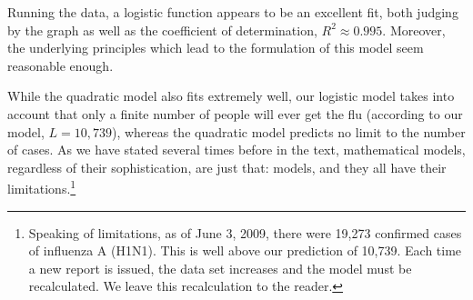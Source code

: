 \documentclass{ximera}
\begin{document}
Running the data, a logistic function appears to be an excellent fit, both judging by the graph as well as the coefficient of determination, $R^2 \approx 0.995$.  Moreover, the underlying principles which lead to the formulation of this model seem reasonable enough.

 
 \begin{center}
 \end{center}

  While the quadratic model also fits extremely well, our logistic model takes into account that only a finite number of people will ever get the flu (according to our model, $L=10,\!739$), whereas the quadratic model predicts no limit to the number of cases. As we have stated several times before in the text, mathematical models, regardless of their sophistication, are just that:  models, and they all have their limitations.\footnote{Speaking of limitations, as of June 3, 2009, there were 19,273 confirmed cases of influenza A (H1N1).  This is well above our prediction of 10,739.  Each time a new report is issued, the data set increases and the model must be recalculated.  We leave this recalculation to the reader.}



\closegraphsfile
\end{document}
